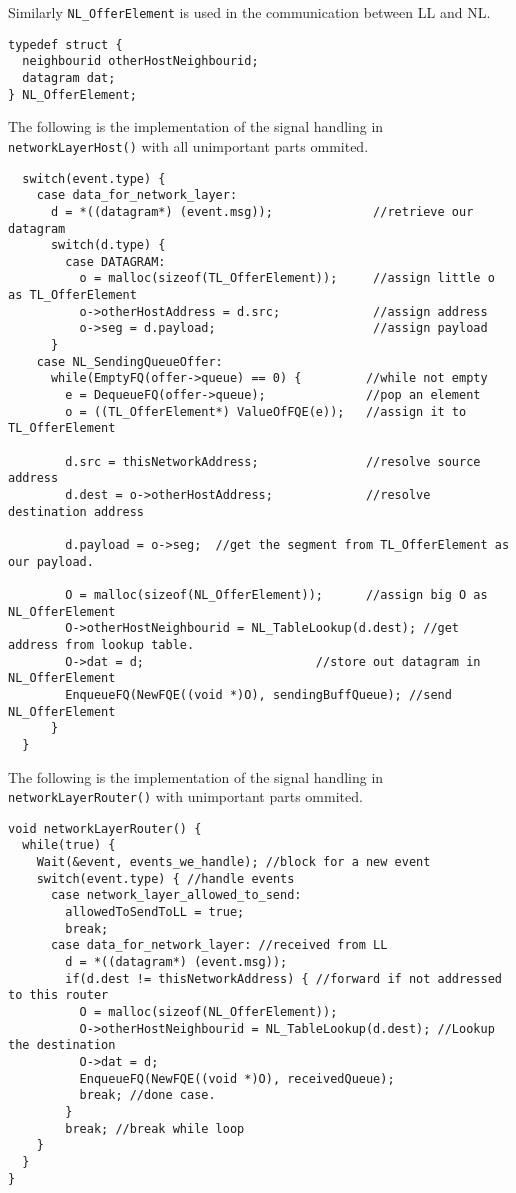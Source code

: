 Similarly \texttt{NL\_OfferElement} is used in the communication between LL and NL.
\begin{lstlisting}
typedef struct {
  neighbourid otherHostNeighbourid;
  datagram dat;
} NL_OfferElement;
\end{lstlisting}

The following is the implementation of the signal handling in \texttt{networkLayerHost()} with all unimportant parts ommited.
\begin{lstlisting}
  switch(event.type) {
    case data_for_network_layer:
      d = *((datagram*) (event.msg));              //retrieve our datagram
      switch(d.type) {
        case DATAGRAM:
          o = malloc(sizeof(TL_OfferElement));     //assign little o as TL_OfferElement
          o->otherHostAddress = d.src;             //assign address
          o->seg = d.payload;                      //assign payload
      }
    case NL_SendingQueueOffer:
      while(EmptyFQ(offer->queue) == 0) {         //while not empty
        e = DequeueFQ(offer->queue);              //pop an element
        o = ((TL_OfferElement*) ValueOfFQE(e));   //assign it to TL_OfferElement

        d.src = thisNetworkAddress;               //resolve source address
        d.dest = o->otherHostAddress;             //resolve destination address

        d.payload = o->seg;  //get the segment from TL_OfferElement as our payload.

        O = malloc(sizeof(NL_OfferElement));      //assign big O as NL_OfferElement
        O->otherHostNeighbourid = NL_TableLookup(d.dest); //get address from lookup table.
        O->dat = d;                        //store out datagram in NL_OfferElement
        EnqueueFQ(NewFQE((void *)O), sendingBuffQueue); //send NL_OfferElement
      }
  }
\end{lstlisting}

The following is the implementation of the signal handling in \texttt{networkLayerRouter()} with unimportant parts ommited.
\begin{lstlisting}
void networkLayerRouter() {
  while(true) {
    Wait(&event, events_we_handle); //block for a new event
    switch(event.type) { //handle events
      case network_layer_allowed_to_send:
        allowedToSendToLL = true;
        break;
      case data_for_network_layer: //received from LL
        d = *((datagram*) (event.msg));
        if(d.dest != thisNetworkAddress) { //forward if not addressed to this router
          O = malloc(sizeof(NL_OfferElement));
          O->otherHostNeighbourid = NL_TableLookup(d.dest); //Lookup the destination
          O->dat = d;
          EnqueueFQ(NewFQE((void *)O), receivedQueue);
          break; //done case.
        }
        break; //break while loop
    }
  }
}
\end{lstlisting}



